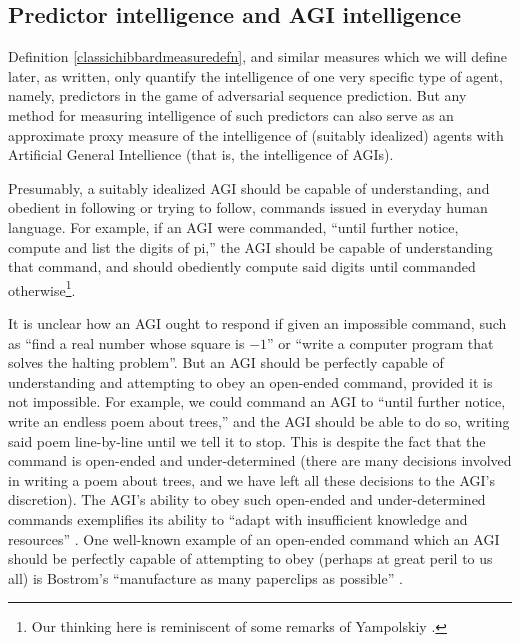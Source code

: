 \documentclass{article}
\begin{document}
\subsection{Predictor intelligence and AGI intelligence}
\label{agiproxysection}

Definition \ref{classichibbardmeasuredefn}, and similar measures which we will
define later, as written, only quantify the intelligence of one very specific type
of agent, namely, predictors in the game of adversarial sequence prediction.
But any method for measuring intelligence of such predictors can also serve as
an approximate proxy measure of the intelligence of (suitably idealized)
agents with Artificial General Intellience (that is, the intelligence of AGIs).

Presumably, a suitably idealized AGI should be capable of understanding, and
obedient in following or trying to follow, commands issued in everyday human language.
For example, if an AGI were commanded, ``until further notice, compute and list the
digits of pi,'' the AGI should be capable of understanding that command, and should
obediently compute said digits until commanded otherwise\footnote{Our thinking
here is reminiscent of some remarks of Yampolskiy \cite{yampolskiy2013turing}.}.

It is unclear how an AGI ought to respond if given an impossible command,
such as ``find a real number whose square is $-1$'' or ``write a computer program
that solves the halting problem''. But an AGI should be perfectly capable of
understanding and attempting to obey an open-ended command, provided it is not
impossible. For example, we could command an AGI to ``until further notice,
write an endless poem about trees,'' and the AGI should be able to do so, writing
said poem line-by-line until we tell it to stop. This is despite the fact that the
command is open-ended and under-determined
(there are many decisions involved in writing a
poem about trees, and we have left all these decisions to the AGI's discretion).
The AGI's ability to obey such open-ended and under-determined commands
exemplifies its
ability to ``adapt with insufficient
knowledge and resources'' \cite{wang2019defining}.
One well-known example of an open-ended command which an AGI should be perfectly
capable of attempting to obey (perhaps at great peril to us all) is
Bostrom's ``manufacture as many paperclips as possible'' \cite{bostrom2003ethical}.
\end{document}
